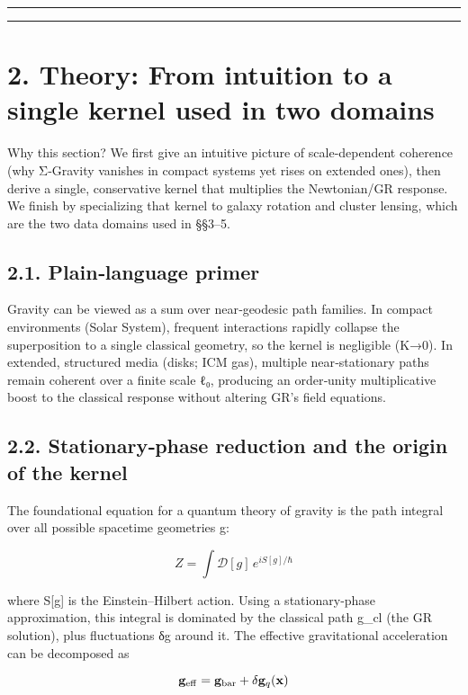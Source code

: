 \documentclass[11pt,a4paper]{article}
\begin{document}
\medskip\hrule\medskip

\medskip\hrule\medskip


\section{2. Theory: From intuition to a single kernel used in two domains}


Why this section? We first give an intuitive picture of scale‑dependent coherence (why Σ‑Gravity vanishes in compact systems yet rises on extended ones), then derive a single, conservative kernel that multiplies the Newtonian/GR response. We finish by specializing that kernel to galaxy rotation and cluster lensing, which are the two data domains used in §§3–5.


\subsection{2.1. Plain‑language primer}


Gravity can be viewed as a sum over near‑geodesic path families. In compact environments (Solar System), frequent interactions rapidly collapse the superposition to a single classical geometry, so the kernel is negligible (K→0). In extended, structured media (disks; ICM gas), multiple near‑stationary paths remain coherent over a finite scale ℓ₀, producing an order‑unity multiplicative boost to the classical response without altering GR’s field equations.


\subsection{2.2. Stationary‑phase reduction and the origin of the kernel}


The foundational equation for a quantum theory of gravity is the path integral over all possible spacetime geometries g:


\begin{equation}
Z = \int \mathcal{D}[g] \, e^{iS[g]/\hbar}
\end{equation}


where S[g] is the Einstein–Hilbert action. Using a stationary‑phase approximation, this integral is dominated by the classical path g\_cl (the GR solution), plus fluctuations δg around it. The effective gravitational acceleration can be decomposed as


\begin{equation}
\mathbf{g}_{\rm eff} = \mathbf{g}_{\rm bar} + \delta\mathbf{g}_q(\mathbf{x})
\end{equation}
\end{document}
